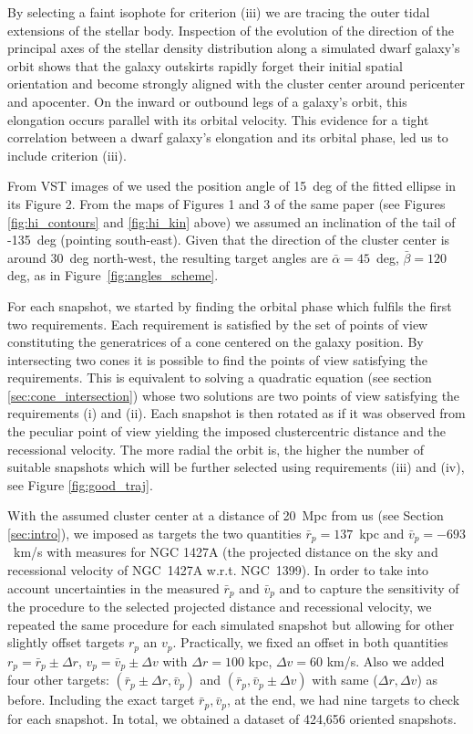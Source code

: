 By selecting a faint isophote for criterion (iii) we are tracing the outer tidal extensions of the stellar body.
Inspection of the evolution of the direction of the principal axes of the stellar density distribution along a simulated dwarf galaxy's orbit shows that the galaxy outskirts rapidly forget their initial spatial orientation and become strongly aligned with the cluster center around pericenter and apocenter. On the inward or outbound legs of a galaxy's orbit, this elongation occurs parallel with its orbital velocity. This evidence for a tight correlation between a dwarf galaxy's elongation and its orbital phase, led us to include criterion (iii).

From VST images of \citet[][]{Lee-Waddell2018} \citep[originally from the deep survey presented in][]{Iodice2016} we used the position angle of 15~deg of the fitted ellipse in its Figure 2.
From the \Hi{} maps of Figures 1 and 3 of the same paper (see Figures \ref{fig:hi_contours} and \ref{fig:hi_kin} above) we assumed an inclination of the \Hi{} tail of -135~deg (pointing south-east).
Given that the direction of the cluster center is around 30~deg north-west, the resulting target angles are $\bar \alpha = 45$~deg, $\bar \beta = 120$ deg, as in Figure~\ref{fig:angles_scheme}.

For each snapshot, we started by finding the orbital phase which fulfils the first two requirements.
Each requirement is satisfied by the set of points of view constituting the generatrices of a cone centered on the galaxy position.
By intersecting two cones it is possible to find the points of view satisfying the requirements.
This is equivalent to solving a quadratic equation (see section \ref{sec:cone_intersection}) whose two solutions are two points of view satisfying the requirements (i) and (ii).
Each snapshot is then rotated as if it was observed from the peculiar point of view yielding the imposed clustercentric distance and the recessional velocity.
The more radial the orbit is, the higher the number of suitable snapshots which will be further selected using requirements (iii) and (iv), see Figure \ref{fig:good_traj}.

With the assumed cluster center at a distance of 20~Mpc from us (see Section \ref{sec:intro}), we imposed as targets the two quantities $\bar r_p=137$~kpc and $\bar v_p=-693$~km/s with measures for NGC 1427A (the projected distance on the sky and recessional velocity of NGC~1427A w.r.t. NGC~1399).
In order to take into account uncertainties in the measured $\bar r_p$ and $\bar v_p$ and to capture the sensitivity of the procedure to the selected projected distance and recessional velocity, we repeated the same procedure for each simulated snapshot but allowing for other slightly offset targets $r_p$ an $v_p$.
Practically, we fixed an offset in both quantities $r_p = \bar r_p \pm \Delta r$, $v_p = \bar v_p \pm \Delta v$ with $\Delta r = 100$ kpc, $\Delta v = 60$ km/s.
Also we added four other targets: $(\bar r_p \pm \Delta r, \bar v_p)$ and $(\bar r_p, \bar v_p \pm \Delta v)$ with same ($\Delta r, \Delta v$) as before.
Including the exact target $\bar r_p, \bar v_p$, at the end, we had nine targets to check for each snapshot.
In total, we obtained a dataset of 424,656 oriented snapshots.

